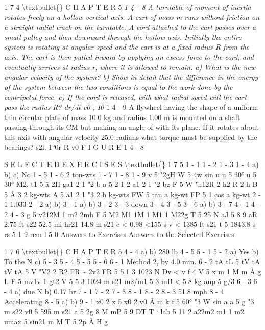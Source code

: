 \documentclass[10pt,oneside]{article}
\begin{document}
1 7 4 \textbackslash{}textbullet\{\} C H A P T E R  5 \emph{ } \emph{ 1 4 - 8 A turntable of moment of inertia rotates freely on a hollow vertical axis. A cart of mass m runs without friction on a straight radial track on the turntable. A cord attached to the cart passes over a small pulley and then downward through the hollow axis. Initially the entire system is rotating at angular speed and the cart is at a fixed radius R from the axis. The cart is then pulled inward by applying an excess force to the cord, and eventually arrives at radius r, where it is allowed to remain. a) What is the new angular velocity of the system? b) Show in detail that the difference in the energy of the system between the two conditions is equal to the work done by the centripetal force. c) If the cord is released, with what radial speed will the cart pass the radius R? dr/dt v0 , I0 } \emph{ } 1 4 - 9 A flywheel having the shape of a uniform thin circular plate of mass 10.0 kg and radius 1.00 m is mounted on a shaft passing through its CM but making an angle of with its plane. If it rotates about this axis with angular velocity 25.0 radians what torque must be supplied by the bearings? s2l, 1°0r R v0 F I G U R E  1 4 - 8\par

S E L E C T E D  E X E R C I S E S \textbackslash{}textbullet\{\} 1 7 5 1 - 1 1 - 2 1 - 3 1 - 4 a) b) c) No 1 - 5 1 - 6 2 ton-wts 1 - 7 1 - 8 1 - 9 v 5 "2gH W 5 4w sin u u 5 30° u 5 30° M2, t1 5 ã 2H ga1 2 1 "2 b a 5 2 1 2 a1 2 1 "2 bg F 5 W "h12R 2 h2 R 2 h B 5 Å 3 2 kg-wts A 5 a1 2 1 "3 2 b kg-wts FW 5 tan a kg-wt FP 5 1 cos a kg-wt 2 - 1 1.033 2 - 2 a) b) 3 - 1 a) b) 3 - 2 3 - 3 down 3 - 4 3 - 5 3 - 6 a) b) 3 - 7 4 - 1 4 - 2 4 - 3 g 5 v212M 1 m2 2mh F 5 M2 M1 1M 1 M1 1 M22g T 5 25 N aJ 5 8 9 aR 2.75 ft s22 52.5 mi hr21 14.8 m s21 e < 0.98 <155 s v < 1385 ft s21 t 5 1843.8 s rs 5 1 9 rem l 5 0 Answers to Exercises Answers to the Selected Exercises\par

1 7 6 \textbackslash{}textbullet\{\} C H A P T E R  5 4 - 4 a) b) 280 lb 4 - 5 5 - 1 5 - 2 a) Yes b) To the N c) 5 - 3 5 - 4 5 - 5 5 - 6 6 - 1 Method 2, by 4.0 min. 6 - 2 tA tL 5 tV tA tV tA 5 V "V2 2 R2 FR \textasciitilde{} 2v2 FR 5 5.1 3 1023 N Dv < v f 4 V 5 x m 1 M m Å g L F 5 mv1v 1 gt2 V 5 5 3 1024 m s21 m2/m1 5 3 mB < 5.8 kg aup 5 g/3 6 - 3 6 - 4 a) due N b) 0.17 hr 7 - 1 7 - 2 7 - 3 8 - 1 8 - 2 8 - 3 51.8 mph 8 - 4 Accelerating 8 - 5 a) b) 9 - 1 x0 2 x 5 x0 2 v0 Å m k f 5 60° "3 W sin a a 5 g "3 m s22 v0 5 595 m s21 a 5 2g 8 M mP 5 9 DT T  ` lab 5 11 2 a22m2 m1 1 m2 umax 5 sin21 m M T 5 2p Å H g\par
\end{document}
